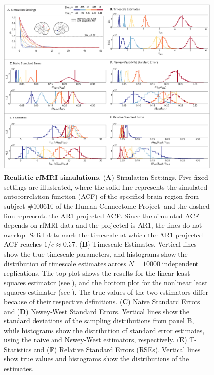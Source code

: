 \documentclass[latex/main.tex]{subfiles}
\begin{document}
\begin{figure}[H]
    \centering
    \includegraphics[width=1\textwidth]{latex/figures/fig03-hcp.png} 
    \caption{
    \textbf{Realistic rfMRI simulations}.
    (\textbf{A}) Simulation Settings. Five fixed settings are illustrated, where the solid line represents the simulated autocorrelation function (ACF) of the specified brain region from subject $\#100610$ of the Human Connectome Project, and the dashed line represents the AR1-projected ACF. Since the simulated ACF depends on rfMRI data and the projected is AR1, the lines do not overlap. Solid dots mark the timescale at which the AR1-projected ACF reaches $1/e \approx 0.37$.
    (\textbf{B}) Timescale Estimates. Vertical lines show the true timescale parameters, and histograms show the distribution of timescale estimates across $N=10000$ independent replications. The top plot shows the results for the linear least squares estimator (see ), and the bottom plot for the nonlinear least squares estimator (see ). The true values of the two estimators differ because of their respective definitions.
    (\textbf{C}) Naive Standard Errors and (\textbf{D}) Newey-West Standard Errors. Vertical lines show the standard deviations of the sampling distributions from panel B, while histograms show the distribution of standard error estimates, using the naive and Newey-West estimators, respectively.
    (\textbf{E}) T-Statistics and (\textbf{F}) Relative Standard Errors (RSEs). Vertical lines show true values and histograms show the distributions of the estimates.
    }
    \label{fig:sim-hcp}
\end{figure}
\end{document}
